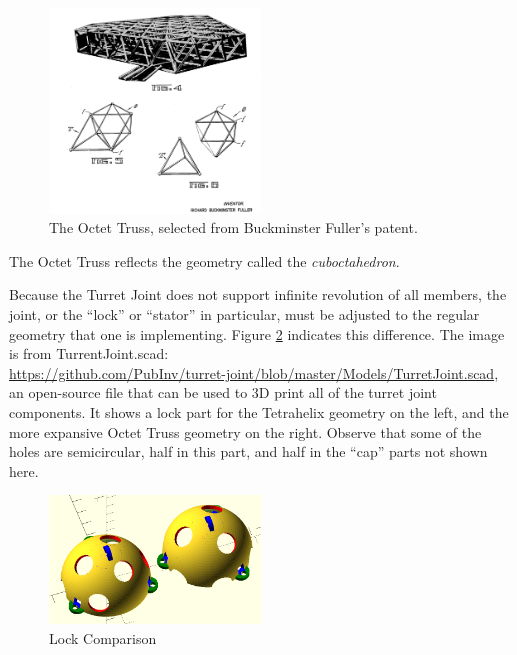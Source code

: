 \documentclass[11pt]{article}
\begin{document}
\begin{figure}[!ht]
  \centering
    \includegraphics[width=0.5\textwidth]{figureslowres/OctetTrussSelection.png}
    \caption[The Octet Truss]{The Octet Truss, selected from Buckminster Fuller's patent.}
      \label{octet-truss-patent}
\end{figure}

The Octet Truss reflects the geometry called the \emph{cuboctahedron}.

Because the Turret Joint does not support infinite revolution of all members, the joint, or the ``lock'' or ``stator'' in particular,
must be adjusted to the regular geometry that one is implementing.  Figure \ref{lockcomparison} indicates this difference.
The image is from TurrentJoint.scad:\\
\url{https://github.com/PubInv/turret-joint/blob/master/Models/TurretJoint.scad}, an
open-source file that can be used to 3D print all of the turret joint components.
It shows a lock part for the Tetrahelix geometry
on the left, and the more expansive Octet Truss geometry on the right. Observe that some of the holes are
semicircular, half in this part,
and half in the ``cap'' parts not shown here.

\begin{figure}[!ht]
  \centering
    \includegraphics[width=0.5\textwidth]{figureslowres/TetrahelixLockVsOctetTrussLock.png}
    \caption[Lock Comparison]{Lock Comparison}
      \label{lockcomparison}
\end{figure}
\end{document}
